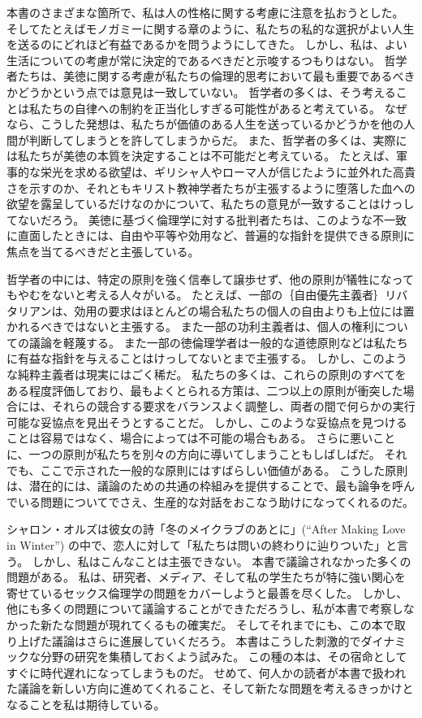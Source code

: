 \documentclass[paper=a4,book,openany]{jlreq}
\begin{document}
本書のさまざまな箇所で、私は人の性格に関する考慮に注意を払おうとした。
そしてたとえばモノガミーに関する章のように、私たちの私的な選択がよい人生を送るのにどれほど有益であるかを問うようにしてきた。
しかし、私は、よい生活についての考慮が常に決定的であるべきだと示唆するつもりはない。
哲学者たちは、美徳に関する考慮が私たちの倫理的思考において最も重要であるべきかどうかという点では意見は一致していない。
哲学者の多くは、そう考えることは私たちの自律への制約を正当化しすぎる可能性があると考えている。
なぜなら、こうした発想は、私たちが価値のある人生を送っているかどうかを他の人間が判断してしまうとを許してしまうからだ。
また、哲学者の多くは、実際には私たちが美徳の本質を決定することは不可能だと考えている。
たとえば、軍事的な栄光を求める欲望は、ギリシャ人やローマ人が信じたように並外れた高貴さを示すのか、それともキリスト教神学者たちが主張するように堕落した血への欲望を露呈しているだけなのかについて、私たちの意見が一致することはけっしてないだろう。
美徳に基づく倫理学に対する批判者たちは、このような不一致に直面したときには、自由や平等や効用など、普遍的な指針を提供できる原則に焦点を当てるべきだと主張している。

\vspace{1\zw}

哲学者の中には、特定の原則を強く信奉して譲歩せず、他の原則が犠牲になってもやむをないと考える人々がいる。
たとえば、一部の｛自由優先主義者｝{リバタリアン}は、効用の要求はほとんどの場合私たちの個人の自由よりも上位には置かれるべきではないと主張する。
また一部の功利主義者は、個人の権利についての議論を軽蔑する。
また一部の徳倫理学者は一般的な道徳原則などは私たちに有益な指針を与えることはけっしてないとまで主張する。
しかし、このような純粋主義者は現実にはごく稀だ。
私たちの多くは、これらの原則のすべてをある程度評価しており、最もよくとられる方策は、二つ以上の原則が衝突した場合には、それらの競合する要求をバランスよく調整し、両者の間で何らかの実行可能な妥協点を見出そうとすることだ。
しかし、このような妥協点を見つけることは容易ではなく、場合によっては不可能の場合もある。
さらに悪いことに、一つの原則が私たちを別々の方向に導いてしまうこともしばしばだ。
それでも、ここで示された一般的な原則にはすばらしい価値がある。
こうした原則は、潜在的には、議論のための共通の枠組みを提供することで、最も論争を呼んでいる問題についてでさえ、生産的な対話をおこなう助けになってくれるのだ。

\vspace{1\zw}

シャロン・オルズは彼女の詩「冬のメイクラブのあとに」(``After Making Love in Winter'') の中で、恋人に対して「私たちは問いの終わりに辿りついた」と言う。
しかし、私はこんなことは主張できない。
本書で議論されなかった多くの問題がある。
私は、研究者、メディア、そして私の学生たちが特に強い関心を寄せているセックス倫理学の問題をカバーしようと最善を尽くした。
しかし、他にも多くの問題について議論することができただろうし、私が本書で考察しなかった新たな問題が現れてくるもの確実だ。
そしてそれまでにも、この本で取り上げた議論はさらに進展していくだろう。
本書はこうした刺激的でダイナミックな分野の研究を集積しておくよう試みた。
この種の本は、その宿命としてすぐに時代遅れになってしまうものだ。
せめて、何人かの読者が本書で扱われた議論を新しい方向に進めてくれること、そして新たな問題を考えるきっかけとなることを私は期待している。
\end{document}
